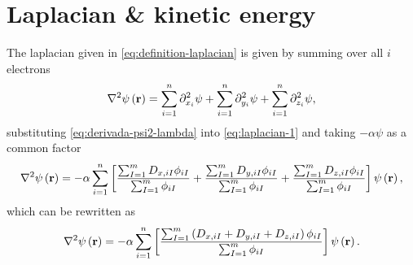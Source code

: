 \section{Laplacian \& kinetic energy}
The laplacian given in \cref{eq:definition-laplacian} is given by summing
over all $i$ electrons 
\begin{equation} \label{eq:laplacian-1}
    \laplacian \psi \left( \mat{r} \right)
    =
    \sum_{i=1}^{n} \partial_{x_i}^{2} \psi +
    \sum_{i=1}^{n} \partial_{y_i}^{2} \psi +
    \sum_{i=1}^{n} \partial_{z_i}^{2} \psi
    ,
\end{equation}
substituting \cref{eq:derivada-psi2-lambda}
into \cref{eq:laplacian-1} and taking $-\alpha \psi$ as a common factor
\begin{equation}
    \laplacian \psi \left( \mat{r} \right)
    =
    -\alpha
    \sum_{i=1}^{n} 
    \left[
        \frac{
            \sum_{I=1}^{m} 
            D_{x,iI}
            \phi_{iI}
        }{
            \sum_{I=1}^{m} \phi_{iI}
        }
        +
        \frac{
            \sum_{I=1}^{m} 
            D_{y,iI}
            \phi_{iI}
        }{
            \sum_{I=1}^{m} \phi_{iI}
        }
        +
        \frac{
            \sum_{I=1}^{m} 
            D_{z,iI}
            \phi_{iI}
        }{
            \sum_{I=1}^{m} \phi_{iI}
        }
    \right]
    \psi \left( \mat{r} \right)
    ,
\end{equation}
which can be rewritten as
\begin{equation} \label{eq:laplacian-2}
    \laplacian \psi \left( \mat{r} \right)
    =
    -\alpha
    \sum_{i=1}^{n} 
    \left[
        \frac{
            \sum_{I=1}^{m} 
            \left(  
                D_{x,iI}
                +
                D_{y,iI}
                +
                D_{z,iI}
            \right)
            \phi_{iI}
        }{
            \sum_{I=1}^{m} \phi_{iI}
        }
    \right]
    \psi \left( \mat{r} \right)
    .
\end{equation}

